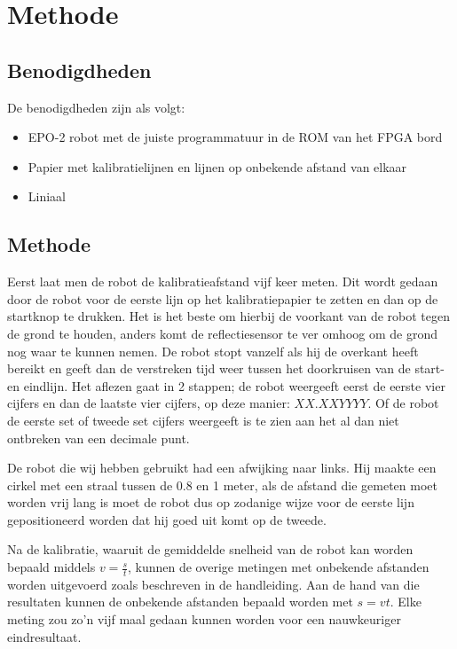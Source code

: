 \section{Methode}
\subsection{Benodigdheden}
De benodigdheden zijn als volgt:
\begin{itemize}
\item EPO-2 robot met de juiste programmatuur in de ROM van het FPGA bord
\item Papier met kalibratielijnen en lijnen op onbekende afstand van elkaar
\item Liniaal
\end{itemize}
\subsection{Methode}
Eerst laat men de robot de kalibratieafstand vijf keer meten. Dit wordt gedaan door de robot voor de eerste lijn op het kalibratiepapier te zetten en dan op de startknop te drukken. Het is het beste om hierbij de voorkant van de robot tegen de grond te houden, anders komt de reflectiesensor te ver omhoog om de grond nog waar te kunnen nemen. De robot stopt vanzelf als hij de overkant heeft bereikt en geeft dan de verstreken tijd weer tussen het doorkruisen van de start- en eindlijn. Het aflezen gaat in 2 stappen; de robot weergeeft eerst de eerste vier cijfers en dan de laatste vier cijfers, op deze manier: $XX.XXYYYY$. Of de robot de eerste set of tweede set cijfers weergeeft is te zien aan het al dan niet ontbreken van een decimale punt. 

De robot die wij hebben gebruikt had een afwijking naar links. Hij maakte een cirkel met een straal tussen de 0.8 en 1 meter, als de afstand die gemeten moet worden vrij lang is moet de robot dus op zodanige wijze voor de eerste lijn gepositioneerd worden dat hij goed uit komt op de tweede.

Na de kalibratie, waaruit de gemiddelde snelheid van de robot kan worden bepaald middels $v=\frac{s}{t}$, kunnen de overige metingen met onbekende afstanden worden uitgevoerd zoals beschreven in de handleiding. Aan de hand van die resultaten kunnen de onbekende afstanden bepaald worden met $s=vt$. Elke meting zou zo'n vijf maal gedaan kunnen worden voor een nauwkeuriger eindresultaat.
